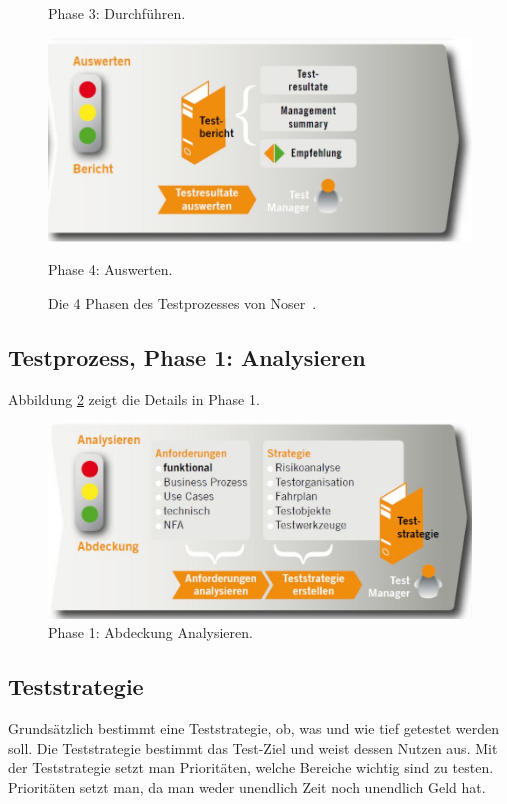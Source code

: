 \begin{figure}
\begin{minipage}{.48\textwidth}
        \caption{Phase 3: Durchführen.} 
    \end{minipage}
    \begin{minipage}{.48\textwidth}
        \centering
        \includegraphics[width=1\linewidth]{02/bilder/Testprozess4.JPG}
        \caption{Phase 4: Auswerten.} 
    \end{minipage}
	\caption{Die 4 Phasen des Testprozesses von Noser~\cite{theNoserWayOfTesting}.}
	\label{fig:Phasen des Testings}
\end{figure}

\subsection{Testprozess, Phase 1: Analysieren}

Abbildung \ref{fig:Testprozess Phase 1} zeigt die Details in Phase 1.

\begin{figure}[H]
	\centering
	\includegraphics[width=0.8\columnwidth]{02/bilder/Testprozess1.JPG}
	\caption{Phase 1: Abdeckung Analysieren.}
	\label{fig:Testprozess Phase 1}
\end{figure}

\subsection{Teststrategie}
Grundsätzlich bestimmt eine Teststrategie, ob, was und wie tief getestet werden soll. Die Teststrategie bestimmt das Test-Ziel und weist dessen Nutzen aus. Mit der Teststrategie setzt man Prioritäten, welche Bereiche wichtig sind zu testen. Prioritäten setzt man, da man weder unendlich Zeit noch unendlich Geld hat.

